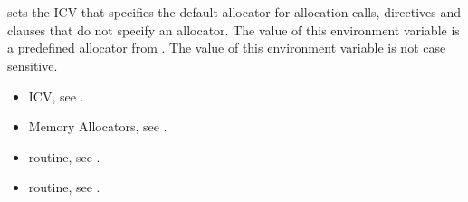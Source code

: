 \section{}
\label{sec:OMP_ALLOCATOR}

 sets the  ICV that specifies the default 
allocator for allocation calls, directives and clauses that do not specify an allocator. 
The value of this environment variable is a predefined allocator from . The value of this environment variable is not case sensitive.

\crossreferences
\begin{itemize}
\item {} ICV, see .

\item Memory Allocators, see .

\item {} routine, see .

\item {} routine, see .
\end{itemize}



